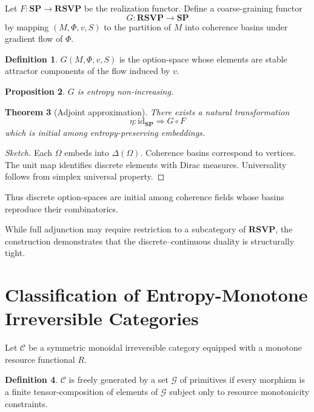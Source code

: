 \documentclass[12pt,a4paper]{article}
\newtheorem{theorem}{Theorem}[section]
\newtheorem{proposition}[theorem]{Proposition}
\theoremstyle{definition}
\newtheorem{definition}[theorem]{Definition}
\theoremstyle{remark}
\newcommand{\SP}{\mathbf{SP}}
\newcommand{\RSVP}{\mathbf{RSVP}}
\newcommand{\id}{\mathrm{id}}
\begin{document}
Let $F : \SP \to \RSVP$ be the realization functor.
Define a coarse-graining functor
\[
  G : \RSVP \to \SP
\]
by mapping $(M,\Phi,v,S)$ to the partition of $M$ into
coherence basins under gradient flow of $\Phi$.

\begin{definition}
$G(M,\Phi,v,S)$ is the option-space whose elements are
stable attractor components of the flow induced by $v$.
\end{definition}

\begin{proposition}
$G$ is entropy non-increasing.
\end{proposition}

\begin{theorem}[Adjoint approximation]
There exists a natural transformation
\[
  \eta : \id_{\SP} \Rightarrow G \circ F
\]
which is initial among entropy-preserving embeddings.
\end{theorem}

\begin{proof}[Sketch]
Each $\Omega$ embeds into $\Delta(\Omega)$.
Coherence basins correspond to vertices.
The unit map identifies discrete elements with Dirac measures.
Universality follows from simplex universal property.
\end{proof}

Thus discrete option-spaces are initial among coherence fields whose
basins reproduce their combinatorics.

While full adjunction may require restriction to a subcategory of
$\RSVP$, the construction demonstrates that the discrete–continuous
duality is structurally tight.

\section{Classification of Entropy-Monotone Irreversible Categories}
\label{sec:classification}

Let $\mathcal{C}$ be a symmetric monoidal irreversible category
equipped with a monotone resource functional $R$.

\begin{definition}
$\mathcal{C}$ is freely generated by a set $\mathcal{G}$ of primitives
if every morphism is a finite tensor-composition of elements of $\mathcal{G}$
subject only to resource monotonicity constraints.
\end{definition}
\end{document}
